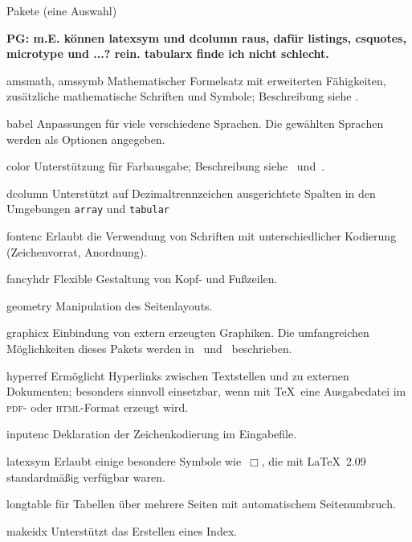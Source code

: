 \begin{table}[htbp]
\caption{Pakete (eine Auswahl)}\label{pack}
\begin{lminipage}{11cm}
\textbf{PG: m.E. können latexsym und dcolumn raus, dafür listings, csquotes, microtype und ...? rein. tabularx finde ich nicht schlecht.}
\begin{ttdescription}%
\setlength{\itemsep}{.5\itemsep plus1pt minus1pt}
\item[amsmath, amssymb] Mathematischer Formelsatz mit erweiterten Fähigkeiten,
  zusätzliche mathematische Schriften und Symbole; Beschreibung siehe
  \cite{ch8}.
\item[babel] Anpassungen für viele verschiedene Sprachen. Die
  gewählten Sprachen werden als Optionen angegeben.
\item[color] Unterstützung für Farbausgabe;
  Beschreibung  siehe~\cite{grfguide} und~\cite{grfcomp}.
\item[dcolumn] Unterstützt auf Dezimaltrennzeichen ausgerichtete
  Spalten in den Umgebungen \texttt{array} und \texttt{tabular}
\item[fontenc] Erlaubt die Verwendung von Schriften mit
  unterschiedlicher Kodierung (Zeichenvorrat, Anordnung).
\item[fancyhdr] Flexible Gestaltung von Kopf- und Fußzeilen.
\item[geometry] Manipulation des Seitenlayouts.
\item[graphicx] Einbindung von extern erzeugten Graphiken.
  Die umfangreichen Möglichkeiten dieses Pakets werden 
  in~\cite{grfguide} und~\cite{grfcomp} beschrieben.
\item[hyperref] Ermöglicht Hyperlinks zwischen Textstellen und zu
  externen Dokumenten; besonders sinnvoll einsetzbar, 
  wenn mit \TeX\ eine Ausgabedatei im \textsc{pdf}- oder \textsc{html}-Format 
  erzeugt wird.
\item[inputenc] Deklaration der Zeichenkodierung im
  Eingabefile.
\item[latexsym] Erlaubt einige besondere Symbole wie~\(\Box\),
  die mit \LaTeX~2.09 standardmäßig verfügbar waren.
\item[longtable]
  für Tabellen über mehrere Seiten mit automatischem Seitenumbruch.
\item[makeidx] Unterstützt das Erstellen eines Index.

\end{ttdescription}
\end{lminipage}
\end{table}
